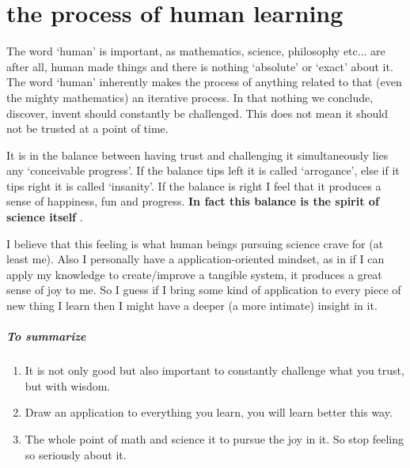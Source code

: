 \documentclass[./main.tex]{subfiles}
\begin{document}
\chapter*{the process of human learning}

The word `human' is important, as mathematics, science, philosophy etc... are after all, human made things and there is nothing `absolute' or `exact' about it.
The word `human' inherently makes the process of anything related to that (even the mighty mathematics) an iterative process.
In that nothing we conclude, discover, invent should constantly be challenged. This does not mean it should not be trusted at a point of time.

It is in the balance between having trust and challenging it simultaneously lies any `conceivable progress'.
If the balance tips left it is called `arrogance', else if it tips right it is called  `insanity'.
If the balance is right I feel that it produces a sense of happiness, fun and progress.
\textbf{In fact this balance is the spirit of science itself} .

I believe that this feeling is what human beings pursuing science crave for (at least me).
Also I personally have a application-oriented mindset, as in if I can apply my knowledge to create/improve a tangible system, it produces a great sense of joy to me.
So I guess if I bring some kind of application to every piece of new thing I learn then I might have a deeper (a more intimate) insight in it.

\paragraph{To summarize}
\begin{enumerate}
  \item It is not only good but also important to constantly challenge what you trust, but with wisdom.
  \item Draw an application to everything you learn, you will learn better this way.
  \item The whole point of math and science it to pursue the joy in it. So stop feeling so seriously about it.
\end{enumerate}
\end{document}
